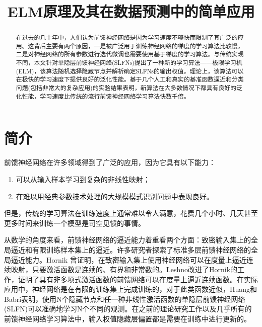 \documentclass[conference]{IEEEtran}
\begin{document}
\title{ELM原理及其在数据预测中的简单应用}

\author{
}

\maketitle

\begin{abstract}
在过去的几十年中，人们认为前馈神经网络是因为学习速度不够快而限制了其广泛的应用。这背后主要有两个原因，一是被广泛用于训练神经网络的梯度的学习算法比较慢，二是对神经网络的所有参数进行迭代微调也需要使用基于梯度的学习算法。与传统实现不同，本文针对单隐层前馈神经网络(SLFNs)提出了一种新的学习算法——极限学习机(ELM)，该算法随机选择隐藏节点并解析确定SLFNs的输出权值。理论上，该算法可以在极快的学习速度下提供良好的泛化性能。基于几个人工和真实的基准函数逼近和分类问题(包括非常大的复杂应用)的实验结果表明，新算法在大多数情况下都具有良好的泛化性能，学习速度比传统的流行前馈神经网络学习算法快数千倍。
\end{abstract}


\section{简介}

前馈神经网络在许多领域得到了广泛的应用，因为它具有以下能力：
\begin{enumerate}
	\item 可以从输入样本学习到复杂的非线性映射；
	\item 在难以用经典参数技术处理的大规模模式识别问题中表现良好。
\end{enumerate}

但是，传统的学习算法在训练速度上通常难以令人满意，花费几个小时、几天甚至更多时间来训练一个模型是司空见惯的事情。

从数学的角度来看，前馈神经网络的逼近能力着重看两个方面：致密输入集上的全局逼近和有限训练样本集上的逼近。许多研究者探索了标准多层前馈神经网络的全局逼近能力。Hornik 曾证明，在致密输入集上使用神经网络可以在度量上逼近连续映射，只要激活函数是连续的、有界和非常数的。Leshno改进了Hornik的工作，证明了具有非多项式激活函数的前馈网络可以在度量上逼近连续函数。在实际应用中，神经网络是在有限的训练集上完成训练的，对于此类函数近似，Huang和Babri表明，使用N个隐藏节点和任一种非线性激活函数的单隐层前馈神经网络(SLFN)可以准确地学习N个不同的观测。在之前的理论研究工作以及几乎所有的前馈神经网络学习算法中，输入权值隐藏层偏置都是需要在训练中进行更新的。
\end{document}
